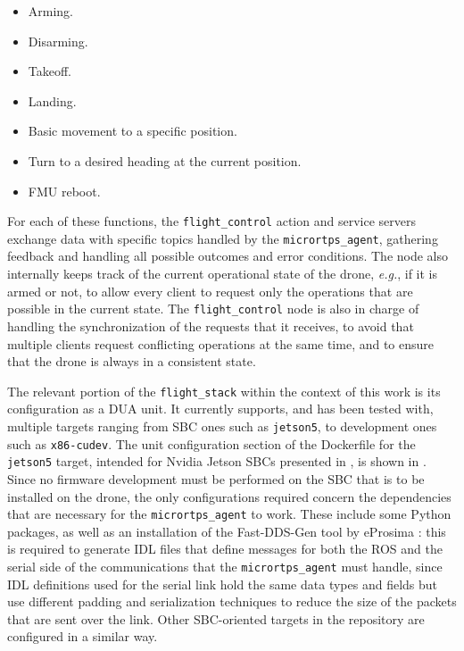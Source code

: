 \begin{itemize}
  \item Arming.
  \item Disarming.
  \item Takeoff.
  \item Landing.
  \item Basic movement to a specific position.
  \item Turn to a desired heading at the current position.
  \item FMU reboot.
\end{itemize}
For each of these functions, the \texttt{flight\_control} action and service servers exchange data with specific topics handled by the \texttt{micrortps\_agent}, gathering feedback and handling all possible outcomes and error conditions. The node also internally keeps track of the current operational state of the drone, \emph{e.g.}, if it is armed or not, to allow every client to request only the operations that are possible in the current state. The \texttt{flight\_control} node is also in charge of handling the synchronization of the requests that it receives, to avoid that multiple clients request conflicting operations at the same time, and to ensure that the drone is always in a consistent state.

The relevant portion of the \texttt{flight\_stack} within the context of this work is its configuration as a DUA unit. It currently supports, and has been tested with, multiple targets ranging from SBC ones such as \texttt{jetson5}, to development ones such as \texttt{x86-cudev}. The unit configuration section of the Dockerfile for the \texttt{jetson5} target, intended for Nvidia Jetson SBCs presented in , is shown in . Since no firmware development must be performed on the SBC that is to be installed on the drone, the only configurations required concern the dependencies that are necessary for the \texttt{micrortps\_agent} to work. These include some Python packages, as well as an installation of the Fast-DDS-Gen tool by eProsima \cite{eprosima_fast-dds-gen_nodate}: this is required to generate IDL files that define messages for both the ROS and the serial side of the communications that the \texttt{micrortps\_agent} must handle, since IDL definitions used for the serial link hold the same data types and fields but use different padding and serialization techniques to reduce the size of the packets that are sent over the link. Other SBC-oriented targets in the repository are configured in a similar way.

